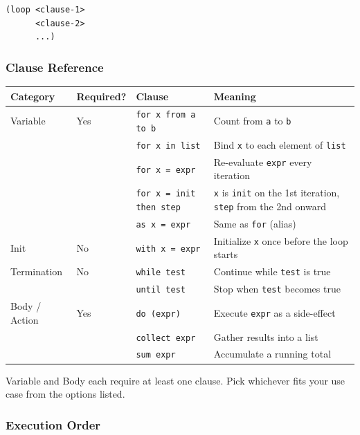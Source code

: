 \begin{lstlisting}
(loop <clause-1>
      <clause-2>
      ...)
\end{lstlisting}

\subsubsection{Clause Reference}

\begin{center}
\begin{tabular}{lllp{5.5cm}}
  \toprule
  \textbf{Category} & \textbf{Required?} & \textbf{Clause} & \textbf{Meaning} \\
  \midrule
  Variable      & Yes & \texttt{for x from a to b}   & Count from \texttt{a} to \texttt{b} \\
                &     & \texttt{for x in list}        & Bind \texttt{x} to each element of \texttt{list} \\
                &     & \texttt{for x = expr}         & Re-evaluate \texttt{expr} every iteration \\
                &     & \texttt{for x = init then step} & \texttt{x} is \texttt{init} on the 1st iteration, \texttt{step} from the 2nd onward \\
                &     & \texttt{as x = expr}          & Same as \texttt{for} (alias) \\
  \midrule
  Init          & No  & \texttt{with x = expr}        & Initialize \texttt{x} once before the loop starts \\
  \midrule
  Termination   & No  & \texttt{while test}           & Continue while \texttt{test} is true \\
                &     & \texttt{until test}           & Stop when \texttt{test} becomes true \\
  \midrule
  Body / Action & Yes & \texttt{do (expr)}            & Execute \texttt{expr} as a side-effect \\
                &     & \texttt{collect expr}         & Gather results into a list \\
                &     & \texttt{sum expr}             & Accumulate a running total \\
  \bottomrule
\end{tabular}
\end{center}

Variable and Body each require at least one clause.
Pick whichever fits your use case from the options listed.

\subsubsection{Execution Order}

